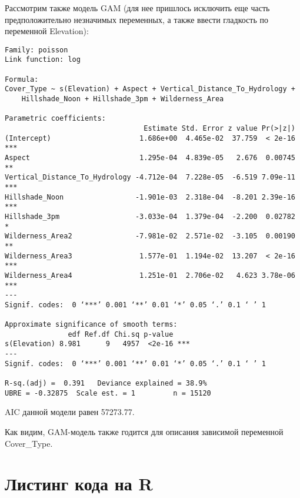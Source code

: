 \documentclass[12pt]{article}
\begin{document}
Рассмотрим также модель GAM (для нее пришлось исключить еще часть предположительно незначимых переменных, а также ввести гладкость
по переменной Elevation):
\begin{verbatim}
Family: poisson
Link function: log

Formula:
Cover_Type ~ s(Elevation) + Aspect + Vertical_Distance_To_Hydrology +
    Hillshade_Noon + Hillshade_3pm + Wilderness_Area

Parametric coefficients:
                                 Estimate Std. Error z value Pr(>|z|)
(Intercept)                     1.686e+00  4.465e-02  37.759  < 2e-16 ***
Aspect                          1.295e-04  4.839e-05   2.676  0.00745 **
Vertical_Distance_To_Hydrology -4.712e-04  7.228e-05  -6.519 7.09e-11 ***
Hillshade_Noon                 -1.901e-03  2.318e-04  -8.201 2.39e-16 ***
Hillshade_3pm                  -3.033e-04  1.379e-04  -2.200  0.02782 *
Wilderness_Area2               -7.981e-02  2.571e-02  -3.105  0.00190 **
Wilderness_Area3                1.577e-01  1.194e-02  13.207  < 2e-16 ***
Wilderness_Area4                1.251e-01  2.706e-02   4.623 3.78e-06 ***
---
Signif. codes:  0 ‘***’ 0.001 ‘**’ 0.01 ‘*’ 0.05 ‘.’ 0.1 ‘ ’ 1

Approximate significance of smooth terms:
               edf Ref.df Chi.sq p-value
s(Elevation) 8.981      9   4957  <2e-16 ***
---
Signif. codes:  0 ‘***’ 0.001 ‘**’ 0.01 ‘*’ 0.05 ‘.’ 0.1 ‘ ’ 1

R-sq.(adj) =  0.391   Deviance explained = 38.9%
UBRE = -0.32875  Scale est. = 1         n = 15120
\end{verbatim}
AIC данной модели равен 57273.77.

Как видим, GAM-модель также годится для описания зависимой переменной Cover\_Type.
\section{Листинг кода на R}

\end{document}
